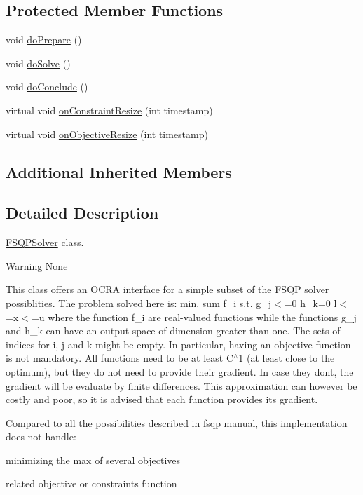 \subsection*{Protected Member Functions}
\begin{DoxyCompactItemize}
\item 
void \hyperlink{classocra_1_1FSQPSolver_a94faaa47095bc05870c1b834621cf232}{do\+Prepare} ()
\item 
void \hyperlink{classocra_1_1FSQPSolver_a72c34e448c726e68ce441b634150b115}{do\+Solve} ()
\item 
void \hyperlink{classocra_1_1FSQPSolver_a792dc111362746ea36b2789a5442100c}{do\+Conclude} ()
\item 
virtual void \hyperlink{classocra_1_1FSQPSolver_a4bee18cc63de9aabefe747e052662351}{on\+Constraint\+Resize} (int timestamp)
\item 
virtual void \hyperlink{classocra_1_1FSQPSolver_a87f59b841b1101fd552f7f9de3d3d99d}{on\+Objective\+Resize} (int timestamp)
\end{DoxyCompactItemize}
\subsection*{Additional Inherited Members}


\subsection{Detailed Description}
\hyperlink{classocra_1_1FSQPSolver}{F\+S\+Q\+P\+Solver} class. 

\begin{DoxyWarning}{Warning}
None
\end{DoxyWarning}
This class offers an O\+C\+RA interface for a simple subset of the F\+S\+QP solver possiblities. The problem solved here is\+: min. sum f\+\_\+i s.\+t. g\+\_\+j$<$=0 h\+\_\+k=0 l$<$=x$<$=u where the function f\+\_\+i are real-\/valued functions while the functions g\+\_\+j and h\+\_\+k can have an output space of dimension greater than one. The sets of indices for i, j and k might be empty. In particular, having an objective function is not mandatory. All functions need to be at least C$^\wedge$1 (at least close to the optimum), but they do not need to provide their gradient. In case they don\textquotesingle{}t, the gradient will be evaluate by finite differences. This approximation can however be costly and poor, so it is advised that each function provides its gradient.

Compared to all the possibilities described in fsqp manual, this implementation does not handle\+:
\begin{DoxyItemize}
\item minimizing the max of several objectives
\item related objective or constraints function 
\end{DoxyItemize}

